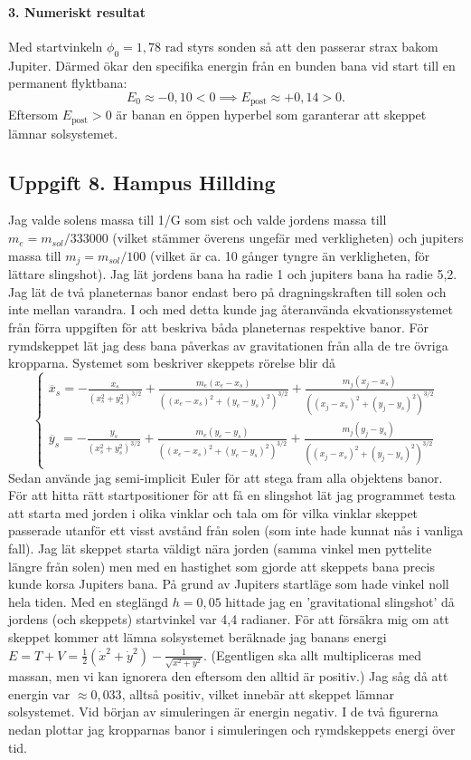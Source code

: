 \documentclass{article}
\begin{document}
\paragraph{3. Numeriskt resultat}
Med startvinkeln $\phi_0 = 1{,}78\text{ rad}$ styrs sonden så att den passerar strax bakom Jupiter. Därmed ökar den specifika energin från en bunden bana vid start till en permanent flyktbana:
\begin{equation}
    E_0 \approx -0{,}10 < 0 \implies E_{\text{post}} \approx +0{,}14 > 0.
\end{equation}
Eftersom $E_{\text{post}} > 0$ är banan en öppen hyperbel som garanterar att skeppet lämnar solsystemet.

\subsection*{Uppgift 8. Hampus Hillding}
Jag valde solens massa till 1/G som sist och valde jordens massa till $m_e=m_{sol}/333000$ (vilket stämmer överens ungefär med verkligheten) och jupiters massa till $m_j=m_{sol}/100$ (vilket är ca. 10 gånger tyngre än verkligheten, för lättare slingshot). Jag lät jordens bana ha radie 1 och jupiters bana ha radie 5,2. Jag lät de två planeternas banor endast bero på dragningskraften till solen och inte mellan varandra. I och med detta kunde jag återanvända ekvationssystemet från förra uppgiften för att beskriva båda planeternas respektive banor. För rymdskeppet lät jag dess bana påverkas av gravitationen från alla de tre övriga kropparna. Systemet som beskriver skeppets rörelse blir då
\begin{equation*}
\begin{cases}
\ddot{x_s}=-\frac{x_s}{(x_s^2+y_s^2)^{3/2}} + \frac{m_e(x_e-x_s)}{((x_e-x_s)^2+(y_e-y_s)^2)^{3/2}}+\frac{m_j(x_j-x_s)}{((x_j-x_s)^2+(y_j-y_s)^2)^{3/2}}\\
\ddot{y_s}=-\frac{y_s}{(x_s^2+y_s^2)^{3/2}} + \frac{m_e(y_e-y_s)}{((x_e-x_s)^2+(y_e-y_s)^2)^{3/2}}+\frac{m_j(y_j-y_s)}{((x_j-x_s)^2+(y_j-y_s)^2)^{3/2}}
\end{cases}
\end{equation*}
Sedan använde jag semi-implicit Euler för att stega fram alla objektens banor. För att hitta rätt startpositioner för att få en slingshot lät jag programmet testa att starta med jorden i olika vinklar och tala om för vilka vinklar skeppet passerade utanför ett visst avstånd från solen (som inte hade kunnat nås i vanliga fall). Jag lät skeppet starta väldigt nära jorden (samma vinkel men pyttelite längre från solen) men med en hastighet som gjorde att skeppets bana precis kunde korsa Jupiters bana. På grund av  Jupiters startläge som hade vinkel noll hela tiden. Med en steglängd $h=0,05$ hittade jag en 'gravitational slingshot' då jordens (och skeppets) startvinkel var 4,4 radianer. För att försäkra mig om att skeppet kommer att lämna solsystemet beräknade jag banans energi $E=T+V =\frac{1}{2}(\dot{x}^2+\dot{y}^2)-\frac{1}{\sqrt{x^2+y^2}}$. (Egentligen ska allt multipliceras med massan, men vi kan ignorera den eftersom den alltid är positiv.) Jag såg då att energin var $\approx 0,033$, alltså positiv, vilket innebär att skeppet lämnar solsystemet. Vid början av simuleringen är energin negativ. I de två figurerna nedan plottar jag kropparnas banor i simuleringen och rymdskeppets energi över tid.
\end{document}
